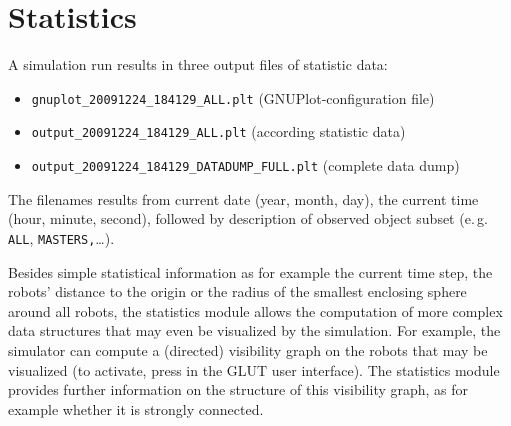 
\section{Statistics}
A simulation run results in three output files of statistic data:

\begin{itemize}
\item \texttt{gnuplot\_20091224\_184129\_ALL.plt} (GNUPlot-configuration file)
\item \texttt{output\_20091224\_184129\_ALL.plt} (according statistic data)
\item \texttt{output\_20091224\_184129\_DATADUMP\_FULL.plt} (complete data dump)
\end{itemize}

The filenames results from current date (year, month, day), the current time (hour, minute, second), followed by description of observed object subset (e.\,g. \texttt{ALL}, \linebreak \texttt{MASTERS,}\dots).

Besides simple statistical information as for example the current time step, the robots' distance to the origin or the radius of the smallest enclosing sphere around all robots, the statistics module allows the computation of more complex data structures that may even be visualized by the simulation. For example, the simulator can compute a (directed) visibility graph on the robots that may be visualized (to activate, press  in the GLUT user interface). The statistics module provides further information on the structure of this visibility graph, as for example whether it is strongly connected.
